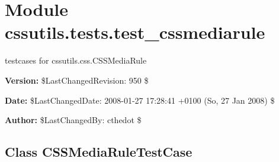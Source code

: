 %
%
%


\section{Module cssutils.tests.test\_cssmediarule}

    \label{cssutils:tests:test_cssmediarule}
testcases for cssutils.css.CSSMediaRule

\textbf{Version:} \$LastChangedRevision: 950 \$



\textbf{Date:} \$LastChangedDate: 2008-01-27 17:28:41 +0100 (So, 27 Jan 2008) \$



\textbf{Author:} \$LastChangedBy: cthedot \$





\subsection{Class CSSMediaRuleTestCase}

